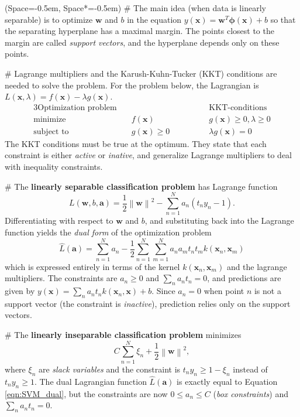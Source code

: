 \documentclass[12pt, a4paper]{article}
\newcommand{\listSpace}{-0.5em}%
\newcommand{\vect}[1]{\bm{#1}}
\newcommand{\norm}[1]{\left\lVert#1\right\rVert}
\begin{document}
\begin{easylist}[itemize]
	\ListProperties(Space=\listSpace, Space*=\listSpace)
	# The main idea (when data is linearly separable) is to optimize $\vect{w}$ and $b$ in the equation $y(\vect{x}) = \vect{w}^T \vect{\phi} (\vect{x}) + b$ so that the separating hyperplane has a maximal margin.
	The points closest to the margin are called \emph{support vectors}, and the hyperplane depends only on these points.
	
	# Lagrange multipliers and the Karush-Kuhn-Tucker (KKT) conditions are needed to solve the problem.
	For the problem below, the Lagrangian is $L(\vect{x}, \lambda) = f(\vect{x}) - \lambda g(\vect{x})$.
	\begin{alignat*}{3}
	\text{Optimization problem} & & \qquad\qquad \text{KKT-conditions}\\
		\operatorname{minimize} & \quad f(\vect{x})& \qquad\qquad g(\vect{x}) \geq 0, \lambda \geq 0 \\
		\text{subject to}  &  \quad g(\vect{x}) \geq 0 & \qquad\qquad \lambda g(\vect{x}) = 0
	\end{alignat*}
	The KKT conditions must be true at the optimum.
	They state that each constraint is either \emph{active} or \emph{inative}, and generalize Lagrange multipliers to deal with inequality constraints.
	
	# The \textbf{linearly separable classification problem} has Lagrange function
	\begin{equation*}
		L(\vect{w}, b, \vect{a}) = \frac{1}{2} \norm{\vect{w}}^2 - \sum_{n=1}^{N} a_n \left( t_n y_n - 1 \right).
	\end{equation*}
	Differentiating with respect to $\vect{w}$ and $b$, and substituting back into the Lagrange function yields the \emph{dual form} of the optimization problem
	\begin{equation}
	\label{eqn:SVM_dual}
	\widehat{L}(\vect{a}) = \sum_{n=1}^{N} a_n -
	\frac{1}{2}
	\sum_{n=1}^{N} \sum_{m=1}^{N} a_n a_m t_n t_m k(\vect{x}_n, \vect{x}_m)
	\end{equation}
	which is expressed entirely in terms of the kernel $k(\vect{x}_n, \vect{x}_m)$ and the lagrange multipliers. 
	The constraints are $a_n \geq 0$ and $\sum_{n} a_n t_n = 0$, and predictions are given by $y(\vect{x}) = \sum_n  a_n  t_n  k(\vect{x}_n, \vect{x}) + b$.
	Since $a_n = 0$ when point $n$ is not a support vector (the constraint is \emph{inactive}), prediction relies only on the support vectors.
	
	# The \textbf{linearly inseparable classification problem} minimizes
	\begin{equation*}
	C \sum_{n=1}^{N} \xi_n + \frac{1}{2} \norm{\vect{w}}^2, 
	\end{equation*}
	where $\xi_n$ are \emph{slack variables} and the constraint is $t_n y_n \geq 1 - \xi_n$ instead of $t_n y_n \geq 1$.
	The dual Lagrangian function $\widehat{L}(\vect{a})$ is exactly equal to Equation \eqref{eqn:SVM_dual}, but the constraints are now $ 0 \leq a_n \leq C$ (\emph{box constraints}) and $\sum_{n} a_n t_n = 0$.
	

\end{easylist}
\end{document}
